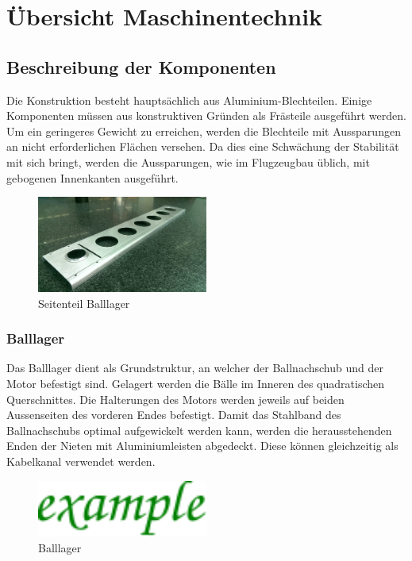 \section{Übersicht Maschinentechnik}

\subsection{Beschreibung der Komponenten}

Die Konstruktion besteht hauptsächlich aus Aluminium-Blechteilen. Einige 
Komponenten müssen aus konstruktiven Gründen als Frästeile ausgeführt werden. 
Um ein geringeres Gewicht zu erreichen, werden die Blechteile mit Aussparungen 
an nicht erforderlichen Flächen versehen. Da dies eine Schwächung der 
Stabilität mit sich bringt, werden die Aussparungen, wie im Flugzeugbau 
üblich, mit gebogenen Innenkanten ausgeführt.

\begin{figure}[h!]
    \centering
    \includegraphics[width=0.5\textwidth]{fig/IMAG0364.jpg}
    \caption{Seitenteil Balllager}
    \label{fig:balllager_side}
\end{figure}

\subsubsection{Balllager}
Das Balllager dient als Grundstruktur, an welcher der Ballnachschub und der 
Motor befestigt sind. Gelagert werden die Bälle im Inneren des quadratischen 
Querschnittes. Die Halterungen des Motors werden jeweils auf beiden 
Aussenseiten des vorderen Endes befestigt. Damit das Stahlband des 
Ballnachschubs optimal aufgewickelt werden kann, werden die herausstehenden 
Enden der Nieten mit Aluminiumleisten abgedeckt. Diese können gleichzeitig als 
Kabelkanal verwendet werden. 

\begin{figure}[h!]
    \centering
    \includegraphics[width=0.5\textwidth]{../example/fig/example.pdf}
    \caption{Balllager}
    \label{fig:balllager}
\end{figure}

